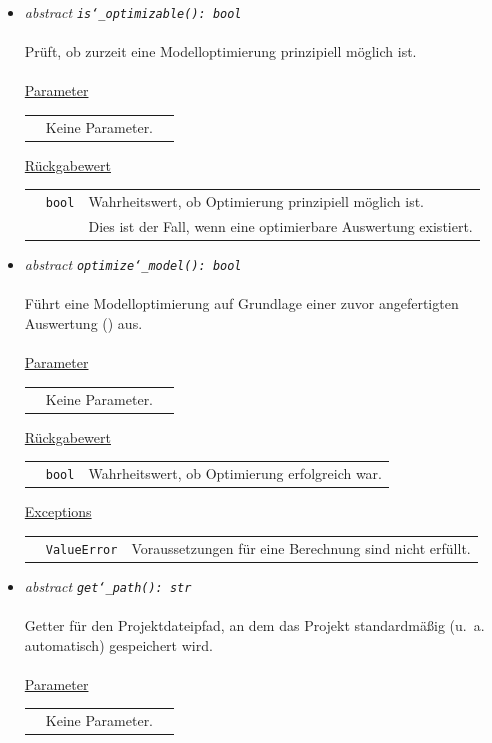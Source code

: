 \documentclass{article}
\newcommand{\classref}[1]{\texttt{\nameref{cls:#1}}}
\begin{document}
\begin{itemize}
\item \textit{\flqq{}abstract\frqq} \texttt{\textit{is\char`_optimizable(): bool}}\\\\
Prüft, ob zurzeit eine Modelloptimierung prinzipiell möglich ist.\\\\
\underline{Parameter}\\
\begin{tabular}{lll}
 & Keine Parameter.
\end{tabular}

\underline{Rückgabewert}\\
\begin{tabular}{lll}
 & \texttt{bool} & Wahrheitswert, ob Optimierung prinzipiell möglich ist.\\
 && Dies ist der Fall, wenn eine optimierbare Auswertung existiert.\\
\end{tabular}


\item \textit{\flqq{}abstract\frqq} \texttt{\textit{optimize\char`_model(): bool}}\\\\
Führt eine Modelloptimierung auf Grundlage einer zuvor angefertigten Auswertung (\classref{Evaluation}) aus.
\\\\
\underline{Parameter}\\
\begin{tabular}{lll}
 & Keine Parameter.\\
\end{tabular}

\underline{Rückgabewert}\\
\begin{tabular}{lll}
 & \texttt{bool} & Wahrheitswert, ob Optimierung erfolgreich war.\\
\end{tabular}

\underline{Exceptions}\\
\begin{tabular}{lll}
 & \texttt{ValueError} & Voraussetzungen für eine Berechnung sind nicht erfüllt.\\
\end{tabular}


\item \textit{\flqq{}abstract\frqq} \texttt{\textit{get\char`_path(): str}}\\\\
Getter für den Projektdateipfad, an dem das Projekt standardmäßig (u.~a. automatisch) gespeichert wird.
\\\\
\underline{Parameter}\\
\begin{tabular}{lll}
 & Keine Parameter.
\end{tabular}


\end{itemize}
\end{document}
